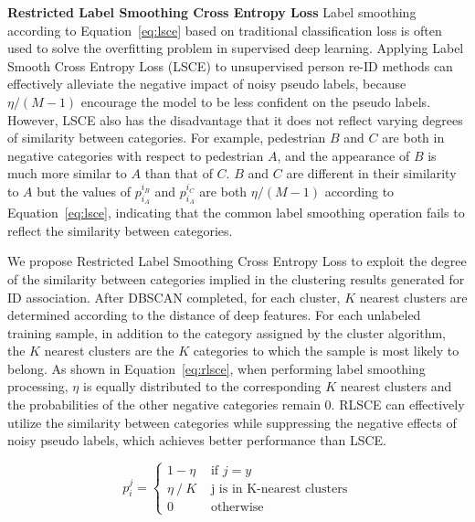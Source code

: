 \documentclass[10pt,twocolumn,letterpaper]{article}
\begin{document}
\noindent \textbf{Restricted Label Smoothing Cross Entropy Loss}
Label smoothing according to Equation~\ref{eq:lsce} based on traditional classification loss is often used to solve the overfitting problem in supervised deep learning. Applying Label Smooth Cross Entropy Loss (LSCE) to unsupervised person re-ID methods can effectively alleviate the negative impact of noisy pseudo labels, because $\eta / (M - 1)$ encourage the model to be less confident on the pseudo labels. However, LSCE also has the disadvantage that it does not reflect varying degrees of similarity between categories. For example, pedestrian $B$ and $C$ are both in negative categories with respect to pedestrian $A$, and the appearance of $B$ is much more similar to $A$ than that of $C$. $B$ and $C$ are different in their similarity to $A$ but the values of $p^{i_{B}}_{i_{A}}$ and $p^{i_{C}}_{i_{A}}$ are both $\eta / (M - 1)$ according to Equation~\ref{eq:lsce}, indicating that the common label smoothing operation fails to reflect the similarity between categories.

We propose Restricted Label Smoothing Cross Entropy Loss to exploit the degree of the similarity between categories implied in the clustering results generated for ID association. After DBSCAN completed, for each cluster, $K$ nearest clusters are determined according to the distance of deep features. For each unlabeled training sample, in addition to the category assigned by the cluster algorithm, the $K$ nearest clusters are the $K$ categories to which the sample is most likely to belong. As shown in Equation~\ref{eq:rlsce}, when performing label smoothing processing, $\eta$ is equally distributed to the corresponding $K$ nearest clusters and the probabilities of the other negative categories remain 0. RLSCE can effectively utilize the similarity between categories while suppressing the negative effects of noisy pseudo labels, which achieves better performance than LSCE.

\begin{equation}
    p_{i}^{j}= \begin{cases}1-\eta & \text { if } j=y \\ \eta \ /\  K & \text { j is in K-nearest clusters} \\ 0 & \text { otherwise }\end{cases}
    \label{eq:rlsce}
\end{equation}
   
\end{document}
